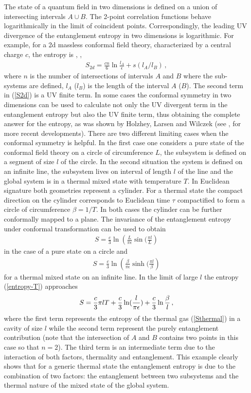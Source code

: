 \documentclass[12pt]{article}
\def\be{\begin{eqnarray}}
\def\ee{\end{eqnarray}}
\def\lb{\label}
\begin{document}
The state of a quantum field in two dimensions is defined on a union of intersecting intervals $A\cup B$.
The 2-point correlation functions behave logarithmically in the limit of coincident points. Correspondingly, the leading UV divergence of the entanglement entropy in two dimensions is logarithmic. For example, for a 2d massless conformal field theory, characterized by a central charge $c$, the entropy is \cite{Srednicki:1993im}, \cite{Callan:1994py}, \cite{Holzhey:1994we}
\be
S_{2d}=\frac{cn}{ 6}\ln \frac{l_A}{\epsilon}+s(l_A/l_B)\, ,
\lb{S2d}
\ee
where $n$ is the number of intersections of intervals $A$ and $B$ where the sub-systems are defined, $l_A$ ($l_B$) is the length of the interval $A$ ($B$). The second term in (\ref{S2d}) is a UV finite term. In some cases the  conformal symmetry in two dimensions can be used  to calculate 
not only the UV divergent term in 
the entanglement entropy but also the UV finite term, thus obtaining the complete answer for the entropy, as was shown by Holzhey, Larsen and Wilczek \cite{Holzhey:1994we} (see \cite{Korepin:2004zz}, \cite{Calabrese:2004eu} for more recent developments).  There are two different limiting cases when the conformal symmetry is helpful. In the first case one considers a pure state of the conformal field theory on a circle of circumference $L$, the subsystem is defined on a segment of size $l$ of the circle.  In the second situation the system is defined on an infinite line, the subsystem lives on interval of length $l$ of the line and the global system is in a thermal mixed state with temperature $T$. In Euclidean signature both geometries represent a cylinder. For a thermal state the compact direction on the cylinder corresponds to Euclidean time $\tau$ compactified to form a circle of circumference $\beta=1/T$.  In both cases the cylinder  can be further conformally mapped to a plane. The invariance of the entanglement entropy under conformal transformation
can be  used to obtain 
\be
S=\frac{c}{3}\ln \left(\frac{L}{\pi\epsilon}\sin(\frac{\pi l}{L}\right)
\lb{entropy-circle}
\ee
in the case of a pure state on a circle and
\be
S=\frac{c}{3}\ln \left(\frac{\beta}{\pi\epsilon}\sinh(\frac{\pi l}{\beta}\right)
\lb{entropy-T}
\ee
for a thermal mixed state on an infinite line. In the limit of large $l$  the entropy (\ref{entropy-T})  approaches 
\be
S=\frac{c}{3}\pi l T+\frac{c}{3}\ln (\frac{l}{\pi\epsilon})+{c\over 3}\ln{\beta\over l}\, ,
\lb{entropy-Tl}
\ee
where the first term represents the entropy of the thermal gas (\ref{Sthermal}) in a cavity of size $l$ while the second term represent the purely entanglement contribution (note that  the intersection of  $A$ and $B$  contains two points in this case so that  $n=2$).
The third term is an intermediate term due to the interaction of both factors,  thermality and entanglement.
This example clearly shows that  for a generic thermal state the entanglement entropy is due to the combination  of two factors: the entanglement between two subsystems and the  thermal nature of the mixed state of the  global system.
\end{document}
